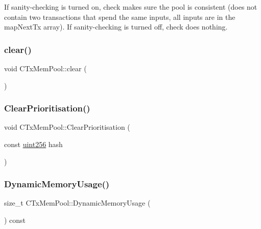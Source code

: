 If sanity-\/checking is turned on, check makes sure the pool is consistent (does not contain two transactions that spend the same inputs, all inputs are in the map\+Next\+Tx array). If sanity-\/checking is turned off, check does nothing. \mbox{\label{class_c_tx_mem_pool_a6dba6bce4139392751321438a29b6b09}} 
\subsubsection{\texorpdfstring{clear()}{clear()}}
{\footnotesize\ttfamily void C\+Tx\+Mem\+Pool\+::clear (\begin{DoxyParamCaption}{ }\end{DoxyParamCaption})}

\mbox{\label{class_c_tx_mem_pool_a11dea05121ab8321e1d1f1a21ec5c9ac}} 
\subsubsection{\texorpdfstring{Clear\+Prioritisation()}{ClearPrioritisation()}}
{\footnotesize\ttfamily void C\+Tx\+Mem\+Pool\+::\+Clear\+Prioritisation (\begin{DoxyParamCaption}\item[{const \mbox{\hyperlink{classuint256}{uint256}}}]{hash }\end{DoxyParamCaption})}

\mbox{\label{class_c_tx_mem_pool_a4fcf05ad5f15a565c4b43c4b9f29906e}} 
\subsubsection{\texorpdfstring{Dynamic\+Memory\+Usage()}{DynamicMemoryUsage()}}
{\footnotesize\ttfamily size\+\_\+t C\+Tx\+Mem\+Pool\+::\+Dynamic\+Memory\+Usage (\begin{DoxyParamCaption}{ }\end{DoxyParamCaption}) const}

